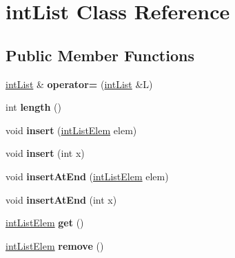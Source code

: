 \hypertarget{classintList}{\section{int\-List \-Class \-Reference}
\label{classintList}
}
\subsection*{\-Public \-Member \-Functions}
\begin{DoxyCompactItemize}
\item 
\hypertarget{classintList_a74c6361f87a64cd5e0f32bff7a9a9359}{\hyperlink{classintList}{int\-List} \& {\bfseries operator=} (\hyperlink{classintList}{int\-List} \&\-L)}\label{classintList_a74c6361f87a64cd5e0f32bff7a9a9359}

\item 
\hypertarget{classintList_ad85dcff7f6f68d196b137909c15b368e}{int {\bfseries length} ()}\label{classintList_ad85dcff7f6f68d196b137909c15b368e}

\item 
\hypertarget{classintList_aa7e17417a68c5d2f397e90fdbb0badee}{void {\bfseries insert} (\hyperlink{structintListElem}{int\-List\-Elem} elem)}\label{classintList_aa7e17417a68c5d2f397e90fdbb0badee}

\item 
\hypertarget{classintList_ae562d3b32e340db9a3b87567eb354eff}{void {\bfseries insert} (int x)}\label{classintList_ae562d3b32e340db9a3b87567eb354eff}

\item 
\hypertarget{classintList_a233a5d4723eed9476fc7d32d0b5f332a}{void {\bfseries insert\-At\-End} (\hyperlink{structintListElem}{int\-List\-Elem} elem)}\label{classintList_a233a5d4723eed9476fc7d32d0b5f332a}

\item 
\hypertarget{classintList_a75b0156dad462982e30c0199f1ca5215}{void {\bfseries insert\-At\-End} (int x)}\label{classintList_a75b0156dad462982e30c0199f1ca5215}

\item 
\hypertarget{classintList_a6346981ce1d2a197199ed6d076c145ec}{\hyperlink{structintListElem}{int\-List\-Elem} {\bfseries get} ()}\label{classintList_a6346981ce1d2a197199ed6d076c145ec}

\item 
\hypertarget{classintList_a16dfc0765f232f02df104248732f9ace}{\hyperlink{structintListElem}{int\-List\-Elem} {\bfseries remove} ()}\label{classintList_a16dfc0765f232f02df104248732f9ace}


\end{DoxyCompactItemize}
